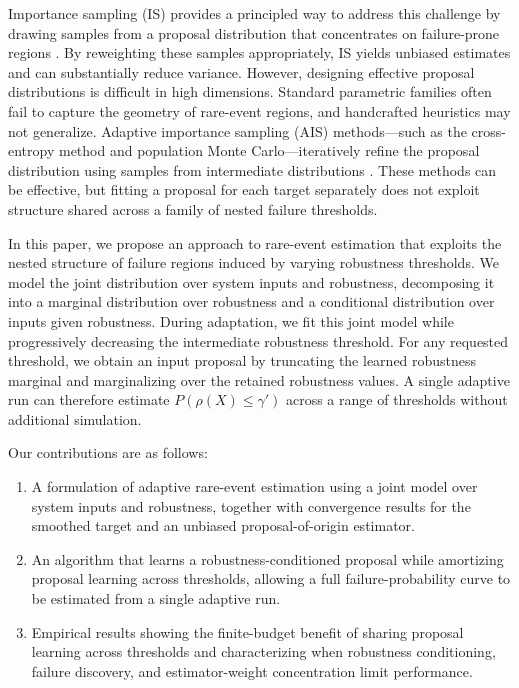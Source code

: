 \documentclass[twoside,11pt]{article}
\begin{document}
Importance sampling (IS) provides a principled way to address this challenge by drawing samples from a proposal distribution that concentrates on failure-prone regions \citep{owen2013monte,rubinstein2016simulation}. By reweighting these samples appropriately, IS yields unbiased estimates and can substantially reduce variance. However, designing effective proposal distributions is difficult in high dimensions. Standard parametric families often fail to capture the geometry of rare-event regions, and handcrafted heuristics may not generalize. Adaptive importance sampling (AIS) methods---such as the cross-entropy method and population Monte Carlo---iteratively refine the proposal distribution using samples from intermediate distributions \citep{rubinstein2004cross,cappe2004population}. These methods can be effective, but fitting a proposal for each target separately does not exploit structure shared across a family of nested failure thresholds.

In this paper, we propose an approach to rare-event estimation that exploits the nested structure of failure regions induced by varying robustness thresholds. We model the joint distribution over system inputs and robustness, decomposing it into a marginal distribution over robustness and a conditional distribution over inputs given robustness. During adaptation, we fit this joint model while progressively decreasing the intermediate robustness threshold. For any requested threshold, we obtain an input proposal by truncating the learned robustness marginal and marginalizing over the retained robustness values. A single adaptive run can therefore estimate \(P(\rho(X)\leq\gamma')\) across a range of thresholds without additional simulation.

Our contributions are as follows:
\begin{enumerate}
\vspace{-1mm}
    \item A formulation of adaptive rare-event estimation using a joint model over system inputs and robustness, together with convergence results for the smoothed target and an unbiased proposal-of-origin estimator.
    \item An algorithm that learns a robustness-conditioned proposal while amortizing proposal learning across thresholds, allowing a full failure-probability curve to be estimated from a single adaptive run.
    \item Empirical results showing the finite-budget benefit of sharing proposal learning across thresholds and characterizing when robustness conditioning, failure discovery, and estimator-weight concentration limit performance.
\end{enumerate}
\end{document}
